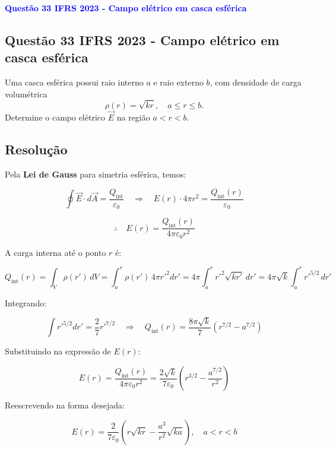 \begin{flushleft}
\textbf{\textcolor{blue}{\Large Questão 33 IFRS 2023 - Campo elétrico em casca esférica}}\\
\noindent

\subsection{Questão 33 IFRS 2023 - Campo elétrico em casca esférica}

Uma casca esférica possui raio interno $a$ e raio externo $b$, com densidade de carga volumétrica 
\[
\rho(r) = \sqrt{k r}, \quad a \le r \le b.
\] 
Determine o campo elétrico $\vec{E}$ na região $a < r < b$.

\subsection*{Resolução}

Pela \textbf{Lei de Gauss} para simetria esférica, temos:

\[
\oint \vec{E} \cdot d\vec{A} = \frac{Q_{\text{int}}}{\varepsilon_0} 
\quad \Rightarrow \quad
E(r) \cdot 4 \pi r^2 = \frac{Q_{\text{int}}(r)}{\varepsilon_0}
\]

\[
\therefore \quad E(r) = \frac{Q_{\text{int}}(r)}{4 \pi \varepsilon_0 r^2}
\]

A carga interna até o ponto $r$ é:

\[
Q_{\text{int}}(r) = \int_{V} \rho(r') \, dV = \int_{a}^{r} \rho(r') \, 4 \pi r'^2 dr' 
= 4 \pi \int_{a}^{r} r'^2 \sqrt{k r'} \, dr'
= 4 \pi \sqrt{k} \int_{a}^{r} r'^{5/2} \, dr'
\]

Integrando:

\[
\int r'^{5/2} dr' = \frac{2}{7} r'^{7/2} \quad \Rightarrow \quad
Q_{\text{int}}(r) = \frac{8 \pi \sqrt{k}}{7} \left( r^{7/2} - a^{7/2} \right)
\]

Substituindo na expressão de $E(r)$:

\[
E(r) = \frac{Q_{\text{int}}(r)}{4 \pi \varepsilon_0 r^2} 
= \frac{2 \sqrt{k}}{7 \varepsilon_0} \left( r^{3/2} - \frac{a^{7/2}}{r^2} \right)
\]

Reescrevendo na forma desejada:

\[
\boxed{
E(r) = \frac{2}{7 \varepsilon_0} \left( r \sqrt{k r} - \frac{a^3}{r^2} \sqrt{k a} \right), \quad a < r < b
}
\]

\end{flushleft}


